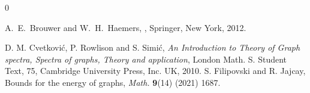 \documentclass[12pt,twoside]{article}
\begin{document}
\begin{thebibliography}{0}
		
		
		A.~E.~Brouwer and W.~H.~Haemers,
		,
		\newblock Springer, New York, 2012.
		
		 D. M. Cvetkovi\'{c}, P. Rowlison and S. Simi\'c, \textit{An Introduction to Theory of Graph spectra, Spectra of graphs, Theory and application}, London Math. S. Student Text, 75, Cambridge University Press, Inc. UK, 2010.
		 S. Filipovski and R. Jajcay, Bounds for the energy of graphs, \textit{Math.} \textbf{9}(14) (2021) 1687.
		

\end{thebibliography}
\end{document}
